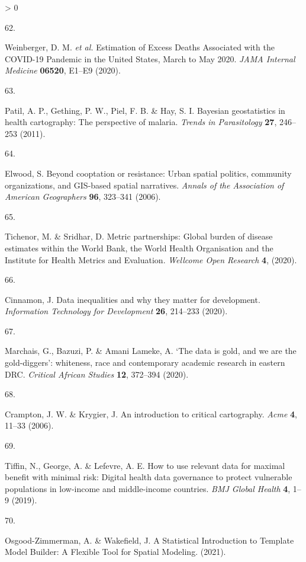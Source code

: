 \documentclass[
]{article}
\newlength{\cslhangindent}
\newlength{\csllabelwidth}
\newenvironment{CSLReferences}[2] %
 {%
  \setlength{\parindent}{0pt}
  \ifodd #1 \everypar{\setlength{\hangindent}{\cslhangindent}}\ignorespaces\fi
  \ifnum #2 > 0
  \setlength{\parskip}{#2\baselineskip}
  \fi
 }%
 {}
\newcommand{\CSLLeftMargin}[1]{\parbox[t]{\csllabelwidth}{#1}}
\newcommand{\CSLRightInline}[1]{\parbox[t]{\linewidth - \csllabelwidth}{#1}\break}
\begin{document}
\begin{CSLReferences}{0}{0}
\leavevmode\hypertarget{ref-Weinberger2020a}{}%
\CSLLeftMargin{62. }
\CSLRightInline{Weinberger, D. M. \emph{et al.} {Estimation of Excess Deaths Associated with the COVID-19 Pandemic in the United States, March to May 2020}. \emph{JAMA Internal Medicine} \textbf{06520}, E1--E9 (2020).}

\leavevmode\hypertarget{ref-Patil2011}{}%
\CSLLeftMargin{63. }
\CSLRightInline{Patil, A. P., Gething, P. W., Piel, F. B. \& Hay, S. I. {Bayesian geostatistics in health cartography: The perspective of malaria}. \emph{Trends in Parasitology} \textbf{27}, 246--253 (2011).}

\leavevmode\hypertarget{ref-Elwood2006}{}%
\CSLLeftMargin{64. }
\CSLRightInline{Elwood, S. {Beyond cooptation or resistance: Urban spatial politics, community organizations, and GIS-based spatial narratives}. \emph{Annals of the Association of American Geographers} \textbf{96}, 323--341 (2006).}

\leavevmode\hypertarget{ref-Tichenor2020}{}%
\CSLLeftMargin{65. }
\CSLRightInline{Tichenor, M. \& Sridhar, D. {Metric partnerships: Global burden of disease estimates within the World Bank, the World Health Organisation and the Institute for Health Metrics and Evaluation}. \emph{Wellcome Open Research} \textbf{4}, (2020).}

\leavevmode\hypertarget{ref-Cinnamon2020a}{}%
\CSLLeftMargin{66. }
\CSLRightInline{Cinnamon, J. {Data inequalities and why they matter for development}. \emph{Information Technology for Development} \textbf{26}, 214--233 (2020).}

\leavevmode\hypertarget{ref-Marchais2020}{}%
\CSLLeftMargin{67. }
\CSLRightInline{Marchais, G., Bazuzi, P. \& Amani Lameke, A. {`The data is gold, and we are the gold-diggers': whiteness, race and contemporary academic research in eastern DRC}. \emph{Critical African Studies} \textbf{12}, 372--394 (2020).}

\leavevmode\hypertarget{ref-Crampton2006}{}%
\CSLLeftMargin{68. }
\CSLRightInline{Crampton, J. W. \& Krygier, J. {An introduction to critical cartography}. \emph{Acme} \textbf{4}, 11--33 (2006).}

\leavevmode\hypertarget{ref-Tiffin2019}{}%
\CSLLeftMargin{69. }
\CSLRightInline{Tiffin, N., George, A. \& Lefevre, A. E. {How to use relevant data for maximal benefit with minimal risk: Digital health data governance to protect vulnerable populations in low-income and middle-income countries}. \emph{BMJ Global Health} \textbf{4}, 1--9 (2019).}

\leavevmode\hypertarget{ref-Osgood-Zimmerman2021}{}%
\CSLLeftMargin{70. }
\CSLRightInline{Osgood-Zimmerman, A. \& Wakefield, J. {A Statistical Introduction to Template Model Builder: A Flexible Tool for Spatial Modeling}. (2021).}


\end{CSLReferences}
\end{document}
